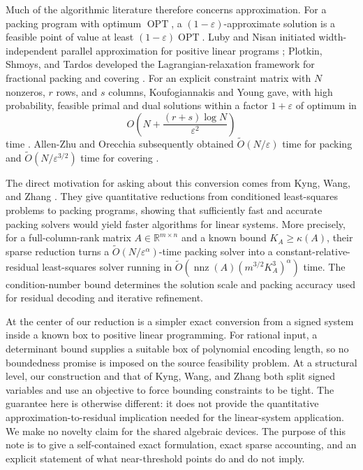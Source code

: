 \documentclass[11pt]{article}
\theoremstyle{remark}
\newcommand{\R}{\mathbb{R}}
\newcommand{\nnz}{\operatorname{nnz}}
\newcommand{\OPT}{\operatorname{OPT}}
\begin{document}
Much of the algorithmic literature therefore concerns approximation.
For a packing program with optimum $\OPT$, a
$(1-\varepsilon)$-approximate solution is a feasible point of value at
least $(1-\varepsilon)\OPT$.  Luby and Nisan initiated
width-independent parallel approximation for positive linear programs
\cite{LubyNisan1993PositiveLinearProgramming}; Plotkin, Shmoys, and
Tardos developed the Lagrangian-relaxation framework for fractional
packing and covering \cite{PlotkinShmoysTardos1995FractionalPackingCovering}.
For an explicit constraint matrix with $N$ nonzeros, $r$ rows, and $s$
columns, Koufogiannakis and Young gave, with high probability, feasible
primal and dual solutions within a factor $1+\varepsilon$ of optimum in
\[
  O\!\left(N+\frac{(r+s)\log N}{\varepsilon^2}\right)
\]
time \cite{KoufogiannakisYoung2014ExplicitFractionalPackingCovering}.
Allen-Zhu and Orecchia subsequently obtained
$\widetilde O(N/\varepsilon)$ time for packing and
$\widetilde O(N/\varepsilon^{3/2})$ time for covering
\cite{AllenZhuOrecchia2019NearlyLinearPackingCovering}.

The direct motivation for asking about this conversion comes from
Kyng, Wang, and Zhang
\cite{KyngWangZhang2020PackingLPsHard}.  They give quantitative
reductions from conditioned least-squares problems to packing programs,
showing that sufficiently fast and accurate packing solvers would yield
faster algorithms for linear systems.  More precisely, for a
full-column-rank matrix $A\in\R^{m\times n}$ and a known bound
$K_A\geq\kappa(A)$, their sparse reduction turns a
$\widetilde O(N/\varepsilon^\alpha)$-time packing solver into a
constant-relative-residual least-squares solver running in
$\widetilde O(\nnz(A)(m^{3/2}K_A^3)^\alpha)$ time.  The condition-number
bound determines the solution scale and packing accuracy used for
residual decoding and iterative refinement.

At the center of our reduction is a simpler exact conversion from a
signed system inside a known box to positive linear programming.  For
rational input, a determinant bound supplies a suitable box of
polynomial encoding length, so no boundedness promise is imposed on the
source feasibility problem.  At a structural level, our construction
and that of Kyng, Wang, and Zhang both split signed variables and use an
objective to force bounding constraints to be tight.  The guarantee
here is otherwise different: it does not provide the quantitative
approximation-to-residual implication needed for the linear-system
application.  We make no novelty claim for the shared algebraic devices.
The purpose of this note is to give a self-contained exact formulation,
exact sparse accounting, and an explicit statement of what
near-threshold points do and do not imply.
\end{document}
